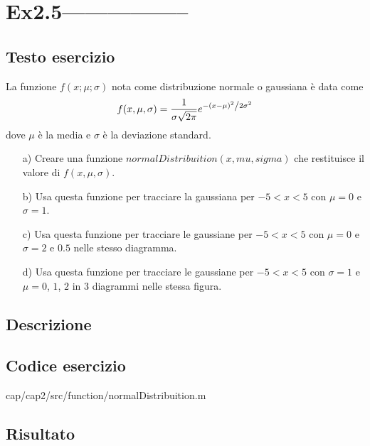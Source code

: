 \section{Ex2.5-----------------}\label{sec:Normal_Distribution}

\subsection{Testo esercizio}
La funzione $f(x;\mu;\sigma)$ nota come distribuzione normale o gaussiana è data come 
$$f(x,\mu,\sigma) = \frac{1}{{\sigma\sqrt{2\pi}}}
e^{{{-\left({x-\mu}\right)^2}\mathord{\left/{\vphantom{{-\left({x-\mu}\right)^2}{2\sigma^2}}}\right.\kern-\nulldelimiterspace}{2\sigma^2}}}$$
dove $\mu$ è la media e $\sigma$ è la deviazione standard.


\begin{itemize}
    \item[a)] Creare una funzione $normalDistribuition(x,mu,sigma)$ che restituisce il 
     valore di $f(x,\mu,\sigma)$.
    
    \item[b)] Usa questa funzione per tracciare la gaussiana per $-5<x<5$ con $\mu=0$ e 
    $\sigma=1$.
    
    \item[c)] Usa questa funzione per tracciare le gaussiane per $-5<x<5$ con $\mu=0$ e 
    $\sigma=2$ e $0.5$ nelle stesso diagramma.
    
    \item[d)] Usa questa funzione per tracciare le gaussiane per $-5<x<5$ con $\sigma=1$ 
    e $\mu=0$, $1$, $2$ in 3 diagrammi nelle stessa figura.
\end{itemize}

\subsection{Descrizione}

\subsection{Codice esercizio}

{cap/cap2/src/function/normalDistribuition.m}



\pagebreak
\subsection{Risultato}

